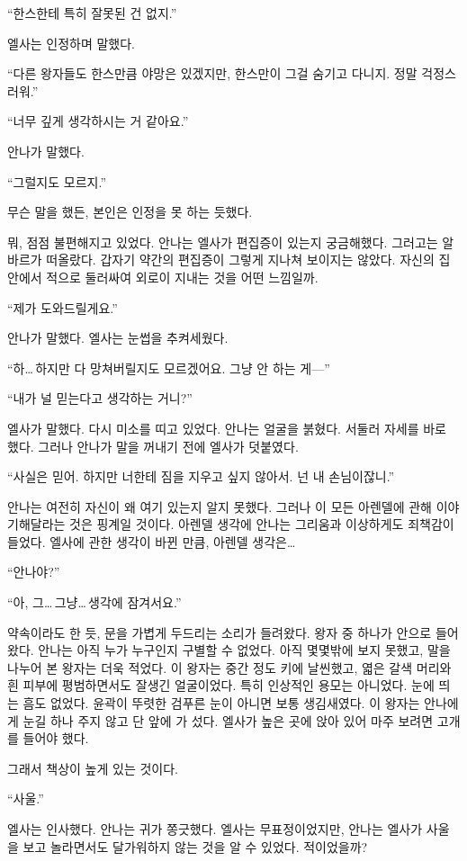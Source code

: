 ``한스한테 특히 잘못된 건 없지.''

엘사는 인정하며 말했다.

``다른 왕자들도 한스만큼 야망은 있겠지만, 한스만이 그걸 숨기고 다니지. 정말 걱정스러워.''

``너무 깊게 생각하시는 거 같아요.''

안나가 말했다.

``그럴지도 모르지.''

무슨 말을 했든, 본인은 인정을 못 하는 듯했다.

뭐, 점점 불편해지고 있었다. 안나는 엘사가 편집증이 있는지 궁금해했다. 그러고는 알바르가 떠올랐다. 갑자기 약간의 편집증이 그렇게 지나쳐 보이지는 않았다. 자신의 집 안에서 적으로 둘러싸여 외로이 지내는 것을 어떤 느낌일까.

``제가 도와드릴게요.''

안나가 말했다. 엘사는 눈썹을 추켜세웠다.

``하\ldots\,하지만 다 망쳐버릴지도 모르겠어요. 그냥 안 하는 게—''

``내가 널 믿는다고 생각하는 거니?''

엘사가 말했다. 다시 미소를 띠고 있었다. 안나는 얼굴을 붉혔다. 서둘러 자세를 바로 했다. 그러나 안나가 말을 꺼내기 전에 엘사가 덧붙였다.

``사실은 믿어. 하지만 너한테 짐을 지우고 싶지 않아서. 넌 내 손님이잖니.''

안나는 여전히 자신이 왜 여기 있는지 알지 못했다. 그러나 이 모든 아렌델에 관해 이야기해달라는 것은 핑계일 것이다. 아렌델 생각에 안나는 그리움과 이상하게도 죄책감이 들었다. 엘사에 관한 생각이 바뀐 만큼, 아렌델 생각은\ldots

``안나야?''

``아, 그\ldots\,그냥\ldots\,생각에 잠겨서요.''

약속이라도 한 듯, 문을 가볍게 두드리는 소리가 들려왔다. 왕자 중 하나가 안으로 들어왔다. 안나는 아직 누가 누구인지 구별할 수 없었다. 아직 몇몇밖에 보지 못했고, 말을 나누어 본 왕자는 더욱 적었다. 이 왕자는 중간 정도 키에 날씬했고, 엷은 갈색 머리와 흰 피부에 평범하면서도 잘생긴 얼굴이었다. 특히 인상적인 용모는 아니었다. 눈에 띄는 흠도 없었다. 윤곽이 뚜렷한 검푸른 눈이 아니면 보통 생김새였다. 이 왕자는 안나에게 눈길 하나 주지 않고 단 앞에 가 섰다. 엘사가 높은 곳에 앉아 있어 마주 보려면 고개를 들어야 했다.

그래서 책상이 높게 있는 것이다.

``사울.''

엘사는 인사했다. 안나는 귀가 쫑긋했다. 엘사는 무표정이었지만, 안나는 엘사가 사울을 보고 놀라면서도 달가워하지 않는 것을 알 수 있었다. 적이었을까?

